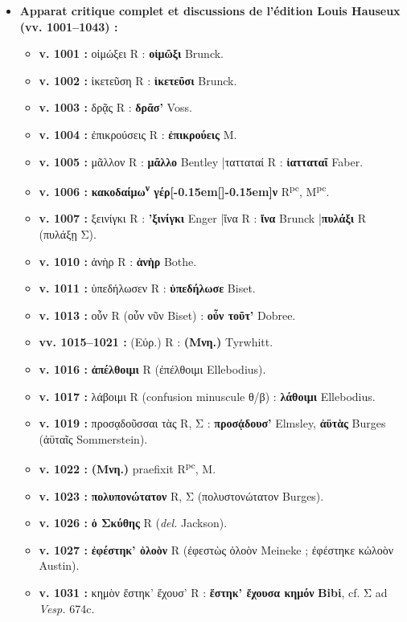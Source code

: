\documentclass[10pt, a4paper, twoside]{book}
\renewcommand{\_}{\origunderscore\penalty0\relax}
\renewcommand{\texttt}[1]{#1}
\providecommand{\italique}[1]{\emph{#1}}
\providecommand{\lecon}[1]{\textbf{#1}}
\providecommand{\expo}[1]{\textsuperscript{#1}}
\providecommand{\Rpc}{R\expo{pc}}
\providecommand{\Mon}{M}
\providecommand{\espApp}{\hspace{0.5em}|\hspace{0.5em}}
\providecommand{\inRas}[2]{[\kern-0.15em[\text{#1}]\kern-0.15em]\text{#2}}
\begin{document}
\begin{itemize}
\begin{itemize}
  \end{itemize}
  \item \textbf{Apparat critique complet et discussions de l'édition Louis Hauseux (\texttt{vv. 1001–1043}) :}
  \begin{itemize}
    \item \textbf{v. 1001 :} οἰμώξει R : \lecon{οἰμῶξι} Brunck.
    \item \textbf{v. 1002 :} ἱκετεῦση R : \lecon{ἱκετεῦσι} Brunck.
    \item \textbf{v. 1003 :} δρᾷς R : \lecon{δρᾶσ'} Voss.
    \item \textbf{v. 1004 :} ἐπικρούσεις R : \lecon{ἐπικρούεις} \Mon{}.
    \item \textbf{v. 1005 :} μᾶλλον R : \lecon{μᾶλλο} Bentley \espApp τατταταί R : \lecon{ἰατταταῖ} Faber.
    \item \textbf{v. 1006 :} \lecon{κακοδαίμω\expo{ν} γέρ\inRas{ω}{ο}ν} \Rpc{}, \Mon{}\expo{pc}.
    \item \textbf{v. 1007 :} ξεινίγκι R : \lecon{'ξινίγκι} Enger \espApp ἵνα R : \lecon{ἴνα} Brunck \espApp \lecon{πυλάξι} R (πυλάξῃ Σ).
    \item \textbf{v. 1010 :} ἀνὴρ R : \lecon{ἁνὴρ} Bothe.
    \item \textbf{v. 1011 :} ὑπεδήλωσεν R : \lecon{ὑπεδήλωσε} Biset.
    \item \textbf{v. 1013 :} οὖν R (οὖν νῦν Biset) : \lecon{οὖν τοῦτ'} Dobree.
    \item \textbf{vv. 1015–1021 :} (Εὐρ.) R : \lecon{(Μνη.)} Tyrwhitt.
    \item \textbf{v. 1016 :} \lecon{ἀπέλθοιμι} R (ἐπέλθοιμι Ellebodius).
    \item \textbf{v. 1017 :} λάβοιμι R (confusion minuscule θ/β) : \lecon{λάθοιμι} Ellebodius.
    \item \textbf{v. 1019 :} προσᾳδοῦσσαι τὰς R, Σ : \lecon{προσᾴδουσ'} Elmsley, \lecon{ἀϋτὰς} Burges (ἀϋταῖς Sommerstein).
    \item \textbf{v. 1022 :} \lecon{(Μνη.)} praefixit \Rpc{}, \Mon{}.
    \item \textbf{v. 1023 :} \lecon{πολυπονώτατον} R, Σ (πολυστονώτατον Burges).
    \item \textbf{v. 1026 :} \lecon{ὁ Σκύθης} R (\italique{del.} Jackson).
    \item \textbf{v. 1027 :} \lecon{ἐφέστηκ' ὀλοὸν} R (ἐφεστὼς ὀλοὸν Meineke ; ἐφέστηκε κὠλοὸν Austin).
    \item \textbf{v. 1031 :} κημὸν ἕστηκ' ἔχουσ' R : \lecon{ἕστηκ' ἔχουσα κημόν} \lecon{Bibi}, cf. Σ ad \italique{Vesp.} 674c.

\end{itemize}
\end{itemize}
\end{document}
